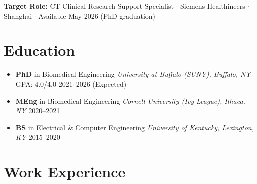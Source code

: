 \documentclass[letterpaper,10pt]{article}
\begin{document}
\begin{center}
  \small
  \textbf{Target Role:} CT Clinical Research Support Specialist $\cdot$ Siemens Healthineers $\cdot$ Shanghai $\cdot$
  Available May 2026 (PhD graduation)
\end{center}

\vspace{-2pt}

\section{Education}

\begin{itemize}[leftmargin=0.0in, label={}, itemsep=2pt, topsep=2pt]
  \item \textbf{PhD} in Biomedical Engineering \hfill \textit{University at Buffalo (SUNY), Buffalo, NY} \hfill GPA: 4.0/4.0 \hfill 2021--2026 (Expected)
  \item \textbf{MEng} in Biomedical Engineering \hfill \textit{Cornell University (Ivy League), Ithaca, NY} \hfill 2020--2021
  \item \textbf{BS} in Electrical \& Computer Engineering \hfill \textit{University of Kentucky, Lexington, KY} \hfill 2015--2020
\end{itemize}

\vspace{-2pt}

\section{Work Experience}
\end{document}
